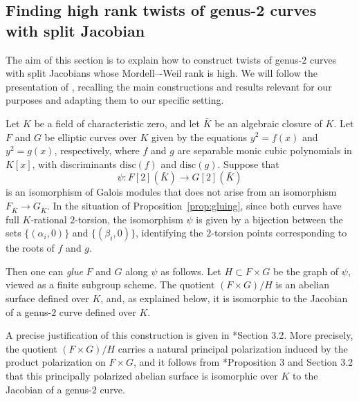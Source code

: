 \documentclass{amsart}
\newcommand{\disc}{\mathrm{disc}}
\begin{document}
\subsection{Finding high rank twists of genus-2 curves with split Jacobian}\label{ssec:twist of split curve}



The aim of this section is to explain how to construct twists of genus-$2$ curves with split Jacobians whose Mordell–-Weil rank is high. We will follow the presentation of \cite{HoweLeprevostPoonen2000}, recalling the main constructions and results relevant for our purposes and adapting them to our specific setting.

Let $K$ be a field of characteristic zero, and let $\bar K$ be an algebraic closure of $K$. 
Let $F$ and $G$ be elliptic curves over $K$ given by the equations $y^{2}=f(x)$ and 
$y^{2}=g(x)$, respectively, where $f$ and $g$ are separable monic cubic polynomials in $K[x]$, 
with discriminants $\disc(f)$ and $\disc(g)$. 
Suppose that
\[
\psi \colon F[2](\bar K)\longrightarrow G[2](\bar K)
\]
is an isomorphism of Galois modules that does not arise from an isomorphism 
$F_{\bar K}\to G_{\bar K}$. In the situation of Proposition~\ref{prop:gluing}, since both curves have full $K$-rational $2$-torsion, the isomorphism $\psi$ is given by a bijection between the sets $\{(\alpha_i,0)\}$ and $\{(\beta_i,0)\}$, identifying the $2$-torsion points corresponding to the roots of $f$ and $g$.

Then one can \emph{glue} $F$ and $G$ along $\psi$ as follows. 
Let $H\subset F\times G$ be the graph of $\psi$, viewed as a finite subgroup scheme. 
The quotient $(F\times G)/H$ is an abelian surface defined over $K$, and, as explained below, it is isomorphic to the Jacobian of a genus-$2$ curve defined over $K$.

A precise justification of this construction is given in  \cite{HoweLeprevostPoonen2000}*{Section 3.2}. 
More precisely, the quotient $(F\times G)/H$ carries a natural principal polarization induced by the product polarization on $F\times G$, and it follows from \cite{HoweLeprevostPoonen2000}*{Proposition 3 and Section 3.2} that this principally polarized abelian surface is isomorphic over $K$ to the Jacobian of a genus-$2$ curve.
\end{document}
